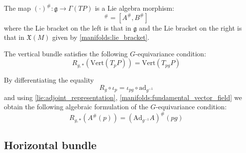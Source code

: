	\begin{property}
		The map $(\cdot)^\#:\mathfrak{g}\rightarrow\Gamma(TP)$ is a Lie algebra morphism:
		\begin{equation}
			[A, B]^\# = [A^\#, B^\#]
		\end{equation}
		where the Lie bracket on the left is that in $\mathfrak{g}$ and the Lie bracket on the right is that in $\mathfrak{X}(M)$ given by \ref{manifolds:lie_bracket}.
	\end{property}
	
		\begin{property}
		The vertical bundle satisfies the following $G$-equivariance condition:
		\begin{equation}
			R_{g, \ast}(\text{Vert}(T_pP)) = \text{Vert}(T_{pg}P)
		\end{equation}
		
		By differentiating the equality \[R_g\circ\iota_p = \iota_{pg}\circ\text{ad}_{g^{-1}}\] and using \ref{lie:adjoint_representation}, \ref{manifolds:fundamental_vector_field} we obtain the following algebraic formulation of the $G$-equivariance condition:
		\begin{equation}
			R_{g, \ast}\left(A^\#(p)\right) = \left(\text{Ad}_{g^{-1}}A\right)^\#(pg)
		\end{equation}
	\end{property}
	
\subsection{Horizontal bundle}

